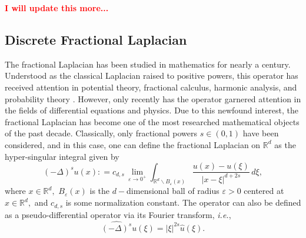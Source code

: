 \documentclass[final,1p,times]{elsarticle}
\def\RR{\mathbb R} %
\newcommand{\bb}[1]{\begin{equation}\label{#1}}
\newcommand{\ee}{\end{equation}}
\newcommand{\no}{\noindent}
\theoremstyle{remark}
\theoremstyle{definition}
\newcommand{\josh}[1]{\textcolor{red}{\textbf{#1}}}
\begin{document}
\vspace{3mm}

\no\josh{I will update this more...}

\subsection{Discrete Fractional Laplacian}

The fractional Laplacian has been studied in mathematics for nearly a century. Understood as the classical Laplacian raised to positive powers, this operator has received attention in potential theory, fractional calculus, harmonic analysis, and probability theory \cite{10.2307/1993412,bogdan1999potential,
baleanu2012fractional,valdinoci2009long}. 
However, only recently has the operator garnered attention in the fields of differential equations and physics.
Due to this newfound interest, the fractional Laplacian has become one of the most researched mathematical objects of the past decade. Classically, only fractional powers $s\in (0,1)$ have been considered, and in this case, one can define the fractional Laplacian on $\RR^d$ as the hyper-singular integral given by
\bb{def1}
(-\Delta)^s u(x)\mathrel{\mathop:}= c_{d,s}\,\lim_{\varepsilon\to 0^+}\int_{\RR^d\backslash B_\varepsilon(x)}\frac{u(x)-u(\xi)}{|x-\xi|^{d+2s}}\,d\xi,
\ee
where $x\in\RR^d,$ $B_\varepsilon(x)$ is the $d-$dimensional ball of radius $\varepsilon>0$ centered at $x\in\RR^d,$ and $c_{d,s}$ is some normalization constant. The operator can also be defined as a pseudo-differential operator via its Fourier transform, {\em i.e.},
\bb{def2}
\widehat{(-\Delta)^s}u(\xi) = |\xi|^{2s}\hat{u}(\xi).
\ee
\end{document}
